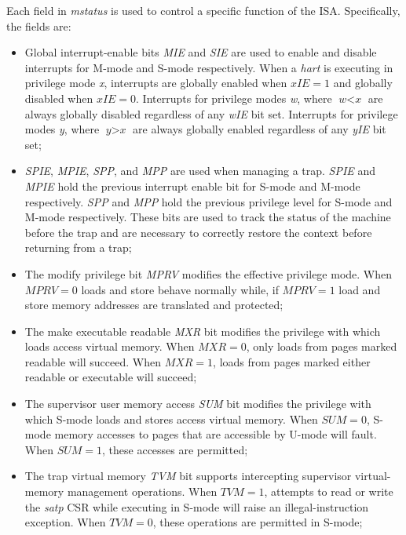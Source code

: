 Each field in \textit{mstatus} is used to control a specific function of the ISA.
Specifically, the fields are:
\begin{itemize}
  \item Global interrupt-enable bits \textit{MIE} and \textit{SIE} are used to enable
    and disable interrupts for M-mode and S-mode respectively. When a \textit{hart}
    is executing in privilege mode \textit{x}, interrupts are globally enabled when
    $\textit{xIE}= 1$ and globally disabled when $\textit{xIE}= 0$. Interrupts
    for privilege modes \textit{w}, where $\textit{w}< \textit{x}$ are always
    globally disabled regardless of any \textit{wIE} bit set. Interrupts for
    privilege modes \textit{y}, where $\textit{y}> \textit{x}$ are always
    globally enabled regardless of any \textit{yIE} bit set;

  \item \textit{SPIE}, \textit{MPIE}, \textit{SPP}, and \textit{MPP} are used
    when managing a trap. \textit{SPIE} and \textit{MPIE} hold the previous interrupt
    enable bit for S-mode and M-mode respectively. \textit{SPP} and \textit{MPP}
    hold the previous privilege level for S-mode and M-mode respectively. These bits
    are used to track the status of the machine before the trap and are necessary
    to correctly restore the context before returning from a trap;

  \item The modify privilege bit \textit{MPRV} modifies the effective privilege
    mode. When $\textit{MPRV}= 0$ loads and store behave normally while, if
    $\textit{MPRV}= 1$ load and store memory addresses are translated and
    protected;

  \item The make executable readable \textit{MXR} bit modifies the privilege
    with which loads access virtual memory. When $\textit{MXR}=0$, only loads
    from pages marked readable will succeed. When $\textit{MXR}=1$, loads from
    pages marked either readable or executable will succeed;

  \item The supervisor user memory access \textit{SUM} bit modifies the
    privilege with which S-mode loads and stores access virtual memory. When $\textit
    {SUM}=0$, S-mode memory accesses to pages that are accessible by U-mode will
    fault. When $\textit{SUM}=1$, these accesses are permitted;

  \item The trap virtual memory \textit{TVM} bit supports intercepting
    supervisor virtual-memory management operations. When $\textit{TVM}=1$,
    attempts to read or write the \textit{satp} CSR while executing in S-mode will
    raise an illegal-instruction exception. When $\textit{TVM}=0$, these operations
    are permitted in S-mode;


\end{itemize}
